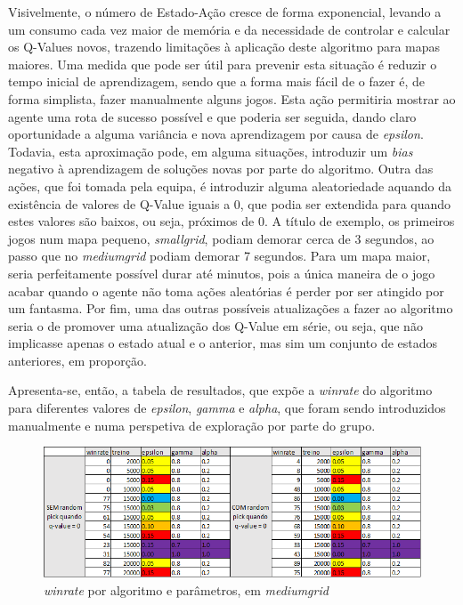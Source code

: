 \documentclass[runningheads]{article}
\begin{document}
\par Visivelmente, o número de Estado-Ação cresce de forma exponencial, levando a um consumo cada vez maior de memória e da necessidade de controlar e calcular os Q-Values novos, trazendo limitações à aplicação deste algoritmo para mapas maiores. Uma medida que pode ser útil para prevenir esta situação é reduzir o tempo inicial de aprendizagem, sendo que a forma mais fácil de o fazer é, de forma simplista, fazer manualmente alguns jogos. Esta ação permitiria mostrar ao agente uma rota de sucesso possível e que poderia ser seguida, dando claro oportunidade a alguma variância e nova aprendizagem por causa de \textit{epsilon}. Todavia, esta aproximação pode, em alguma situações, introduzir um \textit{bias} negativo à aprendizagem de soluções novas por parte do algoritmo. Outra das ações, que foi tomada pela equipa, é introduzir alguma aleatoriedade aquando da existência de valores de Q-Value iguais a 0, que podia ser extendida para quando estes valores são baixos, ou seja, próximos de 0. A título de exemplo, os primeiros jogos num mapa pequeno, \textit{smallgrid}, podiam demorar cerca de 3 segundos, ao passo que no \textit{mediumgrid} podiam demorar 7 segundos. Para um mapa maior, seria perfeitamente possível durar até minutos, pois a única maneira de o jogo acabar quando o agente não toma ações aleatórias é perder por ser atingido por um fantasma. Por fim, uma das outras possíveis atualizações a fazer ao algoritmo seria o de promover uma atualização dos Q-Value em série, ou seja, que não implicasse apenas o estado atual e o anterior, mas sim um conjunto de estados anteriores, em proporção.
\par Apresenta-se, então, a tabela de resultados, que expõe a \textit{winrate} do algoritmo para diferentes valores de \textit{epsilon}, \textit{gamma} e \textit{alpha}, que foram sendo introduzidos manualmente e numa perspetiva de exploração por parte do grupo.

\begin{figure}[H]
\centering
\includegraphics[width=13cm]{images/winrates.png}
\caption{\textit{winrate} por algoritmo e parâmetros, em \textit{mediumgrid}}
\end{figure}
\end{document}

